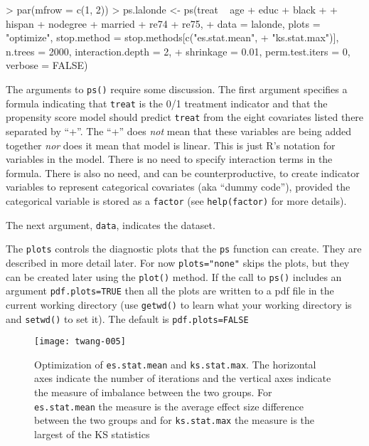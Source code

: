 \documentclass{article}
\begin{document}
\begin{Schunk}
\begin{Sinput}
> par(mfrow = c(1, 2))
> ps.lalonde <- ps(treat ~ age + educ + black + 
+     hispan + nodegree + married + re74 + re75, 
+     data = lalonde, plots = "optimize", stop.method = stop.methods[c("es.stat.mean", 
+         "ks.stat.max")], n.trees = 2000, interaction.depth = 2, 
+     shrinkage = 0.01, perm.test.iters = 0, verbose = FALSE)
\end{Sinput}
\end{Schunk}

The arguments to \texttt{ps()} require some discussion. The first argument
specifies a formula indicating that \texttt{treat} is the 0/1 treatment
indicator and that the propensity score model should predict \texttt{treat}
from the eight covariates listed there separated by ``+''. The ``+'' does
\emph{not} mean that these variables are being added together \emph{nor} does
it mean that model is linear. This is just R's notation for variables in the
model. There is no need to specify interaction terms in the formula. There is
also no need, and can be counterproductive, to create indicator variables to
represent categorical covariates (aka ``dummy code''), provided the categorical
variable is stored as a \texttt{factor} (see \texttt{help(factor)} for more
details).

The next argument, \texttt{data}, indicates the dataset.

The \texttt{plots} controls the diagnostic plots that the \texttt{ps} function can create. 
They are described in more detail later. For now
\texttt{plots="none"} skips the plots, but they can be created later using the
\texttt{plot()} method. If the call to \texttt{ps()} includes an argument
\texttt{pdf.plots=TRUE} then all the plots are written to a pdf file in the
current working directory (use \texttt{getwd()} to learn what your working
directory is and \texttt{setwd()} to set it). The default is
\texttt{pdf.plots=FALSE}

\begin{figure}
\begin{center}
\texttt{[image: twang-005]}
\end{center}
\caption{Optimization of \texttt{es.stat.mean} and \texttt{ks.stat.max}. The
         horizontal axes indicate the number of iterations and the vertical
         axes indicate the measure of imbalance between the two groups. For
         \texttt{es.stat.mean} the measure is the average effect size
         difference between the two groups and for \texttt{ks.stat.max} the
         measure is the largest of the KS statistics}
\label{fig:psoptimize}
\end{figure}
\end{document}
